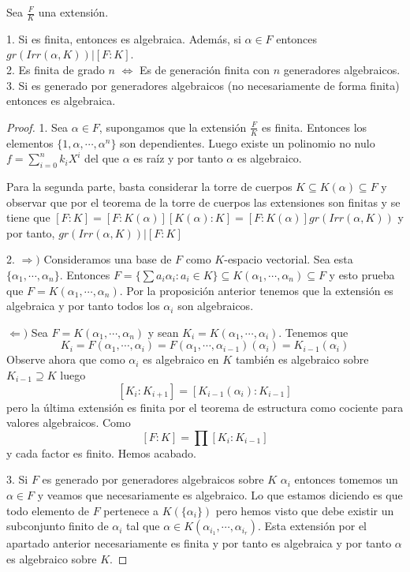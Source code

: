 \begin{proposition}
Sea $\frac{F}{K}$ una extensión. 

1. Si es finita, entonces es algebraica. Además, si $\alpha \in F$ entonces $gr(Irr(\alpha,K)) | [F:K]$. \\
2. Es finita de grado $n$ $\iff$ Es de generación finita con $n$ generadores algebraicos. \\ 
3. Si es generado por generadores algebraicos (no necesariamente de forma finita) entonces es algebraica.
\end{proposition}
\begin{proof}
1. Sea $\alpha \in F$, supongamos que la extensión $\frac{F}{K}$ es finita. Entonces los elementos $\{1,\alpha,\cdots,\alpha^n\}$ son dependientes. Luego existe un polinomio no nulo $f = \sum_{i = 0}^n k_i X^i$ del que $\alpha$ es raíz y por tanto $\alpha$ es algebraico. 

Para la segunda parte, basta considerar la torre de cuerpos $K \subseteq K(\alpha) \subseteq F$ y observar que por el teorema de la torre de cuerpos las extensiones son finitas y se tiene que $[F:K] = [F:K(\alpha)][K(\alpha):K] = [F:K(\alpha)]gr(Irr(\alpha,K))$ y por tanto, $gr(Irr(\alpha,K))|[F:K]$

2. $\Rightarrow)$ Consideramos una base de $F$ como $K$-espacio vectorial. Sea esta $\{\alpha_1,\cdots,\alpha_n\}$. Entonces $F = \{\sum a_i\alpha_i:a_i \in K\} \subseteq K(\alpha_1,\cdots,\alpha_n) \subseteq F$ y esto prueba que $F =  K(\alpha_1,\cdots,\alpha_n)$. Por la proposición anterior tenemos que la extensión es algebraica y por tanto todos los $\alpha_i$ son algebraicos.

$\Leftarrow)$ Sea $F = K(\alpha_1,\cdots,\alpha_n)$ y sean $K_i =  K(\alpha_1,\cdots,\alpha_i)$. Tenemos que $$K_i = F(\alpha_1,\cdots,\alpha_i) = F(\alpha_1,\cdots,\alpha_{i-1})(\alpha_i) = K_{i-1}(\alpha_i)$$ Observe ahora que como $\alpha_i$ es algebraico en $K$ también es algebraico sobre $K_{i-1} \supseteq K$ luego $$[K_i:K_{i+1}] = [K_{i-1}(\alpha_i):K_{i-1}]$$ pero la última extensión es finita por el teorema de estructura como cociente para valores algebraicos. Como $$[F:K] = \prod [K_i:K_{i-1}]$$ y cada factor es finito. Hemos acabado.

3. Si $F$ es generado por generadores algebraicos sobre $K$ $\alpha_i$ entonces tomemos un $\alpha \in F$ y veamos que necesariamente es algebraico. Lo que estamos diciendo es que todo elemento de $F$ pertenece a $K(\{\alpha_i\})$ pero hemos visto que debe existir un subconjunto finito de $\alpha_i$ tal que $\alpha \in K(\alpha_{i_1},\cdots,\alpha_{i_r})$. Esta extensión por el apartado anterior necesariamente es finita y por tanto es algebraica y por tanto $\alpha$ es algebraico sobre $K$. 
\end{proof}

